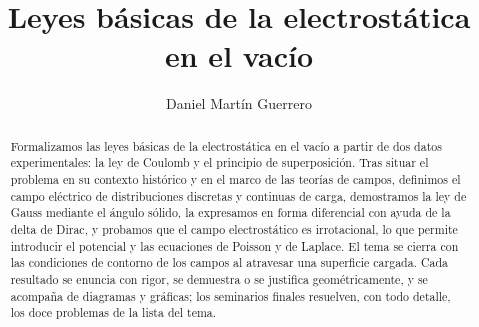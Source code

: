\documentclass[a4paper,11pt]{amsart}
\title{Leyes básicas de la electrostática en el vacío}
\author{Daniel Martín Guerrero}
\date{}
\begin{document}

\clearpage
{}
\setcounter{page}{1}

\begin{abstract}
Formalizamos las leyes básicas de la electrostática en el vacío a partir de
dos datos experimentales: la ley de Coulomb y el principio de superposición.
Tras situar el problema en su contexto histórico y en el marco de las teorías
de campos, definimos el campo eléctrico de distribuciones discretas y continuas
de carga, demostramos la ley de Gauss mediante el ángulo sólido, la expresamos
en forma diferencial con ayuda de la delta de Dirac, y probamos que el campo
electrostático es irrotacional, lo que permite introducir el potencial y las
ecuaciones de Poisson y de Laplace. El tema se cierra con las condiciones de
contorno de los campos al atravesar una superficie cargada. Cada resultado se
enuncia con rigor, se demuestra o se justifica geométricamente, y se acompaña de
diagramas y gráficas; los seminarios finales resuelven, con todo detalle,
los doce problemas de la lista del tema.
\end{abstract}

\maketitle
\tableofcontents










\printbibliography[title={Referencias}]
\end{document}
